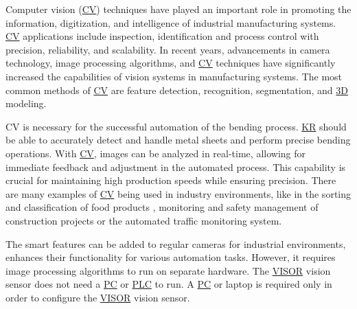 
Computer vision (\hyperref[acro:CV]{CV}) techniques have played an important role in promoting the information, digitization, and intelligence of industrial manufacturing systems.
\hyperref[acro:CV]{CV} applications include inspection, identification and process control with precision, reliability, and scalability.
In recent years, advancements in camera technology, image processing algorithms, and \hyperref[acro:CV]{CV} techniques have significantly increased the capabilities of vision systems in manufacturing systems.
The most common methods of \hyperref[acro:CV]{CV} are feature detection, recognition, segmentation, and \hyperref[acro:3D]{3D} modeling. \cite{9761203}

CV is necessary for the successful automation of the bending process. \hyperref[acro:KR]{KR} should be able to accurately detect and handle metal sheets and perform precise bending operations. With \hyperref[acro:CV]{CV}, images can be analyzed in real-time, allowing for immediate feedback and adjustment in the automated process.
This capability is crucial for maintaining high production speeds while ensuring precision.
There are many examples of \hyperref[acro:CV]{CV} being used in industry environments, like in the sorting and classification of food products \cite{BARNES2010339, THROOP2005281,BURGOSARTIZZU2010138}, monitoring and safety management of construction projects \cite{PANERU2021103940} or the automated traffic monitoring system. \cite{7892717,COIFMAN1998271}

The smart features can be added to regular cameras for industrial environments, enhances their functionality for various automation tasks. \cite{BREZANI2022298} However, it requires image processing algorithms to run on separate hardware. 
The \hyperref[acro:VISOR]{VISOR}\textsuperscript{\textregistered} vision sensor does not need a \hyperref[acro:PC]{PC} or \hyperref[acro:PLC]{PLC} to run. A \hyperref[acro:PC]{PC} or laptop is required only in order to configure the
\hyperref[acro:VISOR]{VISOR}\textsuperscript{\textregistered} vision sensor. \cite[page 23]{visor_user_manual}